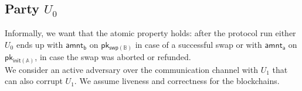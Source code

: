 \documentclass{article}      	%
\begin{document}

\subsection{Party $U_0$}

Informally, we want that the atomic property holds: after the protocol run either $U_0$ ends up with $\mathsf{amnt_b}$ on $\mathsf{pk_{swp(\mathbb{B})}}$ in case of a successful swap or with $\mathsf{amnt_a}$ on $\mathsf{pk_{init(\mathbb{A})}}$, in case the swap was aborted or refunded.  \\
We consider an active adversary over the communication channel with $U_1$ that can also corrupt $U_1$. We assume liveness and correctness for the blockchains.\\
\end{document}
